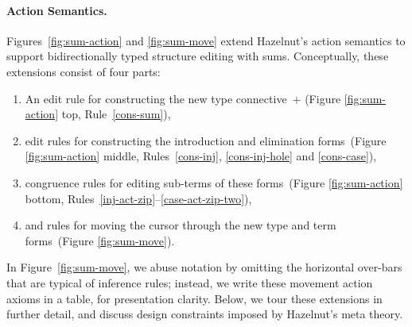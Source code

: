 \paragraph{Action Semantics.}
Figures~\ref{fig:sum-action} and \ref{fig:sum-move} extend Hazelnut's
action semantics to support bidirectionally typed structure editing with sums.
%
Conceptually, these extensions consist of four parts:
\begin{enumerate}
\item 
An edit rule for
constructing the new type connective~$+$ (Figure \ref{fig:sum-action} top, Rule~\ref{cons-sum}), 
%
\item 
edit rules for constructing the introduction and elimination
forms~(Figure \ref{fig:sum-action} middle, Rules~\ref{cons-inj}, \ref{cons-inj-hole} and \ref{cons-case}),
%
\item
congruence rules for editing sub-terms of these
forms~(Figure \ref{fig:sum-action} bottom, Rules~\ref{inj-act-zip}--\ref{case-act-zip-two}),
%
\item 
and rules for moving the cursor through the new type and term
forms~(Figure \ref{fig:sum-move}).  
\end{enumerate}
In Figure~\ref{fig:sum-move}, we
abuse notation by omitting the horizontal over-bars that are typical
of inference rules; instead, we write these movement action axioms in
a table, for presentation clarity.
%
Below, we tour these extensions in further detail, and discuss design
constraints imposed by Hazelnut's meta theory.




